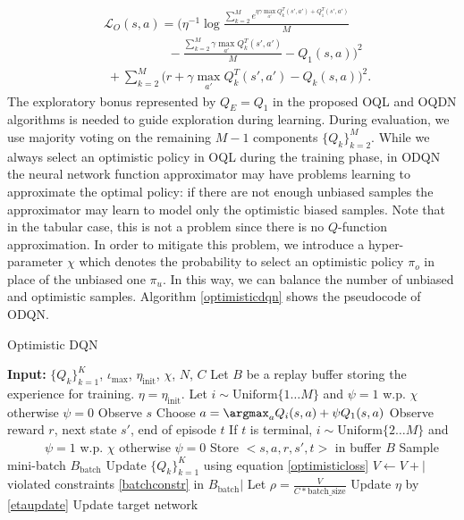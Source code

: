 \begin{eqnarray}
	&\mathcal{L}_O(s,a) = \bigg(\eta^{-1}\log \frac{\sum_{k=2}^M
	 e^{\eta\gamma\max_{a'}Q_k^T(s',a')+ Q_1^T(s',a')}}{M}\nonumber \\
&\qquad\qquad\;\;\;\;  -  \frac{\sum_{k=2}^M  \gamma\max_{a'}Q^T_k(s',a')}{M} -Q_1(s,a)\bigg)^2\nonumber \\
&\;  + \sum_{k=2}^M \bigg(r + \gamma\max_{a'}Q^T_k(s',a') -
	 Q_k(s,a)\bigg)^2.  \label{optimisticloss}
\end{eqnarray}
The exploratory bonus represented by $Q_E = Q_1$ in the proposed OQL and OQDN algorithms is needed to
guide exploration during learning. During evaluation, we use majority voting on the remaining $M-1$
components $\{Q_k\}_{k=2}^M$. While we always select an optimistic policy in OQL during the training phase, in
ODQN the neural network function approximator may have problems learning to approximate the optimal
policy: if there are not enough unbiased samples the approximator may learn to model only the optimistic
biased samples. Note that in the tabular case, this is not a problem since there is no $Q$-function
approximation. In order to mitigate this problem, we introduce a hyper-parameter $\chi$ which denotes the probability to select an optimistic policy $\pi_o$ in place of the unbiased one $\pi_u$. In this way, we can balance the number of unbiased and optimistic samples.
Algorithm \ref{optimisticdqn} shows the pseudocode of ODQN. 
\begin{algorithm}[t]
	\caption{Optimistic DQN}
	\label{optimisticdqn}
	\begin{algorithmic}
		\STATE \textbf{Input:} $\{Q_k\}_{k=1}^K$, $\iota_{\max}$, $\eta_{\mathrm{init}}$, $\chi$, $N$, $C$
		\STATE Let $B$ be a replay buffer storing the experience for training.
		\STATE $\eta = \eta_{\mathrm{init}}$.
		\STATE Let $i \sim \mathrm{Uniform}\{1 \dots M\}$ and $\psi = 1$ w.p. $\chi$ otherwise $\psi = 0$
		\STATE Observe $s$
		\STATE Choose $a = \argmax_a Q_i(s,a) + \psi Q_1(s,a)$
		\STATE Observe reward $r$, next state $s'$, end of episode $t$
		\STATE If $t$ is terminal, $i \sim \mathrm{Uniform}\{2 \dots M\}$ and \\ \ \ \ \ \ \ $\psi = 1$ w.p. $\chi$ otherwise $\psi=0$
		\STATE Store $<s,a,r,s',t>$ in buffer $B$
		\STATE Sample mini-batch $B_{\mathrm{batch}}$
		\STATE Update $\{Q_k\}_{k=1}^K$ using equation \eqref{optimisticloss}
		\STATE $V \leftarrow V + |$ violated constraints \eqref{batchconstr} in $B_{\mathrm{batch}}|$ 
		\ENDFOR
		\STATE Let $\rho = \frac{V}{C * \mathrm{batch\_size}}$
		\STATE Update $\eta$ by \eqref{etaupdate}
		\STATE Update target network
		\ENDFOR
	\end{algorithmic}
\end{algorithm}

